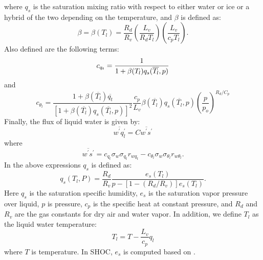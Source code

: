 %
where $q_{s}$ is the saturation mixing ratio with respect to either water or ice or a hybrid of the two depending on the temperature, and $\beta$ is defined as:
%
\begin{equation}
  \beta=\beta(T_{l})=\frac{R_{d}}{R_{v}}\left(\frac{L_{v}}{R_{d}T_{l}}\right)\left(\frac{L_{v}}{c_{p}T_{l}}\right).
  \label{beta_equation}
\end{equation}
%
Also defined are the following terms:
%
\begin{equation}
  c_{q_{t}}=\frac{1}{1+\beta (T_{l})q_{s}(\overline{T_{l}},p)}\\
  \label{cqt_term}
\end{equation}
%
and
%
\begin{equation}  
  c_{\theta_{l}}=\frac{1+ \beta (\overline{T_{l}})\overline{q_{t}}}{[1+\beta (\overline{T_{l}})q_{s}(\overline{T_{l}},p)]^{2}}\frac{c_{p}}{L_{v}}\beta (\overline{T_{l}}) q_{s}(\overline{T_{l}},p)\left(\frac{p}{p_{o}}\right)^{R_{d}/C_{p}}
  \label{cthl_term}
\end{equation}
%
Finally, the flux of liquid water is given by:
%
\begin{equation}
  \overline{w^{'}q_{l}^{'}}=C\overline{w^{'}s^{'}}
  \label{wql_equation}
\end{equation}
%
where
%
\begin{equation}
  \overline{w^{'}s^{'}}=c_{q_{t}}\sigma_{w}\sigma_{q_{t}}r_{wq_{t}}-c_{\theta_{l}}\sigma_{w}\sigma_{\theta_{l}}r_{w\theta_{l}} .
  \label{wql_s}
\end{equation}
% 
In the above expressions $q_{s}$ is defined as:
%
\begin{equation}
  q_s (T_{l},P) = \frac{R_{d}}{R_{v}}\frac{e_{s}(T_{l})}{p-[1-(R_{d}/R_{v})]e_{s}(T_{l})}.
  \label{qs_equation}
\end{equation}
%
Here $q_{s}$ is the saturation specific humidity, $e_{s}$ is the saturation vapor pressure over liquid, $p$ is pressure, $c_{p}$ is the specific heat at constant pressure, and $R_{d}$ and $R_{v}$ are the gas constants for dry air and water vapor.  In addition, we define $T_{l}$ as the liquid water temperature:
%
\begin{equation}
  T_{l} = T - \frac{L_{v}}{c_{p}}q_{l}
  \label{T_liq}
\end{equation}
% 
where $T$ is temperature.  In SHOC, $e_{s}$ is computed based on \cite{Flatau_et92}.  

%
